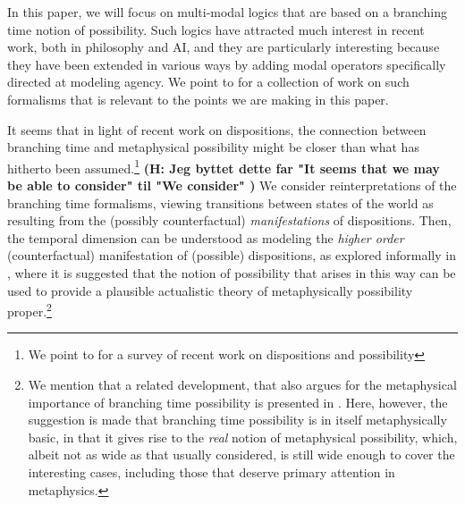 \documentclass{article}
\newcommand{\hannah}[1]{\textbf{\textcolor{OliveGreen}{(H: #1)}}}
\begin{document}
In this paper, we will focus on multi-modal logics that are based on a branching time notion of possibility. Such logics have attracted much interest in recent work, both in philosophy and AI, and they are particularly interesting because they have been extended in various ways by adding modal operators specifically directed at modeling agency. We point to \cite{stit,dstit,atl,atle,nctl,stitstart} for a collection of work on such formalisms that is relevant to the points we are making in this paper.

It seems that in light of recent work on dispositions, the connection between branching time and metaphysical possibility might be closer than what has hitherto been assumed.\footnote{We point to \cite{MwPw} for a survey of recent work on dispositions and possibility} \hannah{Jeg byttet dette far "It seems that we may be able to consider" til "We consider" } We consider reinterpretations of the branching time formalisms, viewing transitions between states of the world as resulting from the (possibly counterfactual) \emph{manifestations} of dispositions. Then, the temporal dimension can be understood as modeling the \emph{higher order} (counterfactual) manifestation of (possible) dispositions, as explored informally in \cite{dispmod}, where it is suggested that the notion of possibility that arises in this way can be used to provide a plausible actualistic theory of metaphysically possibility proper.\footnote{We mention that a related development, that also argues for the metaphysical importance of branching time possibility is presented in \cite{realmod}. Here, however, the suggestion is made that branching time possibility is in itself metaphysically basic, in that it gives rise to the \emph{real} notion of metaphysical possibility, which, albeit not as wide as that usually considered, is still wide enough to cover the interesting cases, including those that deserve primary attention in metaphysics.}
\end{document}
